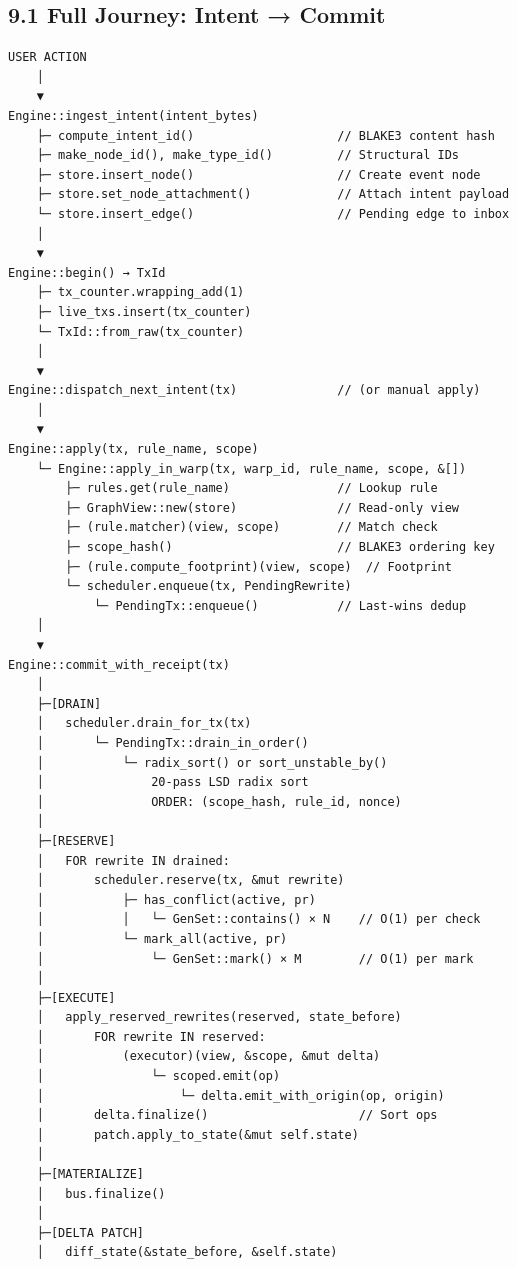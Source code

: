 \documentclass[11pt]{book}
\begin{document}
\subsection{9.1 Full Journey: Intent →
Commit}\label{full-journey-intent-commit}

\begin{verbatim}
USER ACTION
    │
    ▼
Engine::ingest_intent(intent_bytes)
    ├─ compute_intent_id()                    // BLAKE3 content hash
    ├─ make_node_id(), make_type_id()         // Structural IDs
    ├─ store.insert_node()                    // Create event node
    ├─ store.set_node_attachment()            // Attach intent payload
    └─ store.insert_edge()                    // Pending edge to inbox
    │
    ▼
Engine::begin() → TxId
    ├─ tx_counter.wrapping_add(1)
    ├─ live_txs.insert(tx_counter)
    └─ TxId::from_raw(tx_counter)
    │
    ▼
Engine::dispatch_next_intent(tx)              // (or manual apply)
    │
    ▼
Engine::apply(tx, rule_name, scope)
    └─ Engine::apply_in_warp(tx, warp_id, rule_name, scope, &[])
        ├─ rules.get(rule_name)               // Lookup rule
        ├─ GraphView::new(store)              // Read-only view
        ├─ (rule.matcher)(view, scope)        // Match check
        ├─ scope_hash()                       // BLAKE3 ordering key
        ├─ (rule.compute_footprint)(view, scope)  // Footprint
        └─ scheduler.enqueue(tx, PendingRewrite)
            └─ PendingTx::enqueue()           // Last-wins dedup
    │
    ▼
Engine::commit_with_receipt(tx)
    │
    ├─[DRAIN]
    │   scheduler.drain_for_tx(tx)
    │       └─ PendingTx::drain_in_order()
    │           └─ radix_sort() or sort_unstable_by()
    │               20-pass LSD radix sort
    │               ORDER: (scope_hash, rule_id, nonce)
    │
    ├─[RESERVE]
    │   FOR rewrite IN drained:
    │       scheduler.reserve(tx, &mut rewrite)
    │           ├─ has_conflict(active, pr)
    │           │   └─ GenSet::contains() × N    // O(1) per check
    │           └─ mark_all(active, pr)
    │               └─ GenSet::mark() × M        // O(1) per mark
    │
    ├─[EXECUTE]
    │   apply_reserved_rewrites(reserved, state_before)
    │       FOR rewrite IN reserved:
    │           (executor)(view, &scope, &mut delta)
    │               └─ scoped.emit(op)
    │                   └─ delta.emit_with_origin(op, origin)
    │       delta.finalize()                     // Sort ops
    │       patch.apply_to_state(&mut self.state)
    │
    ├─[MATERIALIZE]
    │   bus.finalize()
    │
    ├─[DELTA PATCH]
    │   diff_state(&state_before, &self.state)

\end{verbatim}
\end{document}
